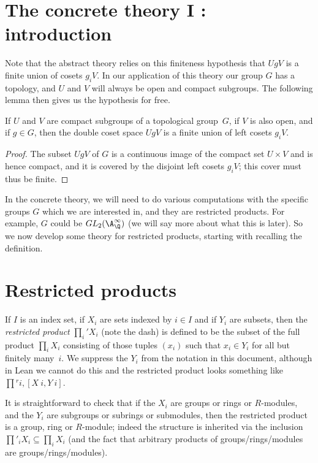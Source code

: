 \section{The concrete theory I : introduction}

Note that the abstract theory relies on this finiteness hypothesis that $UgV$
is a finite union of cosets $g_iV$. In our application of this theory our group
$G$ has a topology, and $U$ and $V$ will always be open and compact subgroups.
The following lemma then gives us the hypothesis for free.

\begin{lemma}
  \label{QuotientGroup.mk_image_finite_of_compact_of_open}
  \leanok
  If $U$ and $V$ are compact subgroups of a topological group~$G$,
  if $V$ is also open, and if $g\in G$, then the double coset space $UgV$
  is a finite union of left cosets $g_iV$.
\end{lemma}
\begin{proof}
  The subset $UgV$ of $G$ is a continuous image of the compact set $U\times V$
  and is hence compact, and it is covered by the disjoint left cosets $g_iV$;
  this cover must thus be finite.
\end{proof}

In the concrete theory, we will need to do various computations with the
specific groups $G$ which we are interested in, and they are restricted products.
For example, $G$ could be $GL_2(\A_{\Q}^\infty)$ (we will say more about
what this is later). So we now develop some theory for restricted products,
starting with recalling the definition.

\section{Restricted products}

If $I$ is an index set, if $X_i$ are sets indexed by $i\in I$ and if $Y_i$
are subsets, then the \emph{restricted product} $\prod_i'X_i$ (note the dash) is defined
to be the subset of the full product $\prod_i X_i$ consisting of those
tuples $(x_i)$ such that $x_i\in Y_i$ for all but finitely many~$i$. We suppress
the $Y_i$ from the notation in this document, although in Lean we cannot do this and
the restricted product looks something like $\prod{}^{r} i,[X\ i, Y\ i]$.

It is straightforward to check that if the $X_i$ are groups or rings or $R$-modules,
and the $Y_i$ are subgroups or subrings or submodules, then the restricted product
is a group, ring or $R$-module; indeed the structure is inherited via the
inclusion $\prod'_iX_i\subseteq\prod_iX_i$ (and the fact that arbitrary products
of groups/rings/modules are groups/rings/modules).

